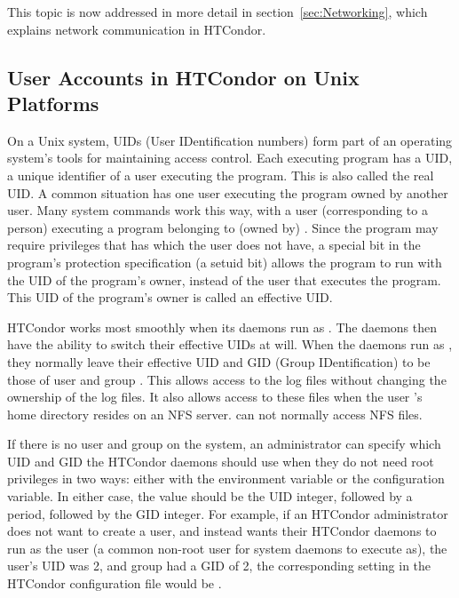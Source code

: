 This topic is now addressed in more detail in
section~\ref{sec:Networking}, which explains network communication in
HTCondor.

\subsection{\label{sec:uids}User Accounts in HTCondor on Unix Platforms}


On a Unix system,
UIDs (User IDentification numbers) form part of an operating system's
tools for maintaining access control.
Each executing program has a UID,
a unique identifier of a user executing the program.
This is also called the real UID.
A common situation has one user executing the program owned
by another user.
Many system commands work this way, with a user (corresponding
to a person) executing a program belonging to (owned by) .
Since the program may require privileges that  has which
the user does not have, a special bit in the program's
protection specification (a setuid bit) allows the program
to run with the UID of the program's owner, instead of the
user that executes the program.
This UID of the program's owner is called an effective UID.

HTCondor works most smoothly when its daemons run as .
The daemons then have the ability to switch their 
effective UIDs at will.
When the daemons run as ,
they normally leave their effective UID and GID (Group IDentification)
to be those of user and group .
This allows access to the log files without
changing the ownership of the log files.
It also allows access to these files when
the user 's home directory resides on an NFS server.
 can not normally access NFS files.

If there is no  user and group on the system, an
administrator can specify which UID and GID the HTCondor daemons should
use when they do not need root privileges in two ways:
either with the  environment variable or the
 configuration variable.
In either case, the value should be the UID integer, followed by a
period, followed by the GID integer.
For example, if an HTCondor administrator does not want to create a
 user, and instead wants their HTCondor daemons to run as
the  user (a common non-root user for system daemons to
execute as), the  user's UID was 2, and group
 had a GID of 2, the corresponding setting in the HTCondor
configuration file would be .

